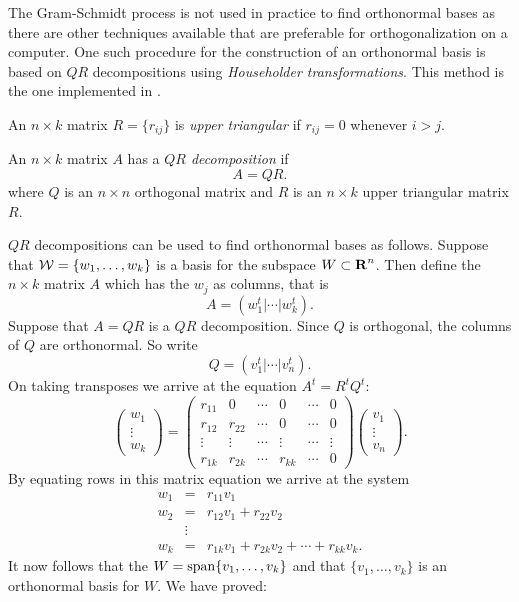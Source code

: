 The Gram-Schmidt process is not used in practice to find orthonormal bases
as there are other techniques available that are preferable for
orthogonalization on a computer.  One such procedure for the construction of
an orthonormal basis is based on $QR$ decompositions using {\em Householder
transformations}.  This method is the one
implemented in \Matlab.

An $n\times k$ matrix $R=\{r_{ij}\}$ is {\em upper triangular\/} if
$r_{ij}=0$ whenever $i>j$.

\begin{Def}  \label{qr-Def} 
An $n\times k$ matrix $A$ has a {\em $QR$ decomposition\/} if
\begin{equation} \label{eq:qrdecom}
A=QR.
\end{equation}
where $Q$ is an $n\times n$
orthogonal matrix
and $R$ is an $n\times k$
upper triangular matrix $R$.
\end{Def}

$QR$ decompositions can be used to find orthonormal bases as follows.
Suppose that ${\cal W} = \{w_1,\ldots,w_k\}$ is a basis for the subspace
$W\subset\mbox{$\bf{R}$}^n$.  Then define the $n\times k$ matrix $A$ which has the $w_j$
as columns, that is
\[
A = (w_1^t|\cdots|w_k^t).
\]
Suppose that $A=QR$ is a $QR$ decomposition.  Since $Q$ is orthogonal, the
columns of $Q$ are orthonormal.  So write
\[
Q = (v_1^t|\cdots|v_n^t).
\]
On taking transposes we arrive at the equation $A^t=R^tQ^t$:
\[
\left(\begin{array}{c} w_1 \\ \vdots \\ w_k \end{array} \right)
= \left(\begin{array}{cccccc}  r_{11} & 0 & \cdots & 0 & \cdots & 0\\
	r_{12} & r_{22} & \cdots & 0  & \cdots & 0 \\
	\vdots & \vdots & \cdots & \vdots & \cdots & \vdots\\
	r_{1k} & r_{2k} & \cdots & r_{kk}& \cdots & 0 \end{array} \right)
 \left(\begin{array}{c} v_1 \\ \vdots \\ v_n \end{array} \right).
\]
By equating rows in this matrix equation we arrive at the system
\begin{equation} \label{eq:wrv}
\begin{array}{rcl}
w_1 & = & r_{11}v_1 \\
w_2 & = & r_{12}v_1 + r_{22}v_2 \\
& \vdots & \\
w_k & = & r_{1k}v_1 + r_{2k}v_2 + \cdots + r_{kk}v_k.
\end{array}
\end{equation}
It now follows that the $W={\rm span}\{v_1,\ldots,v_k\}$ and that
$\{v_1,\ldots,v_k\}$ is an orthonormal basis for $W$.  We have proved:

